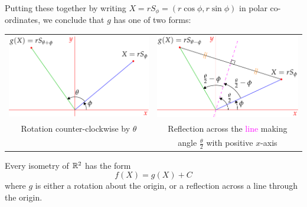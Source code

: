 Putting these together by writing $X=rS_\phi=(r\cos\phi,r\sin\phi)$ in polar co-ordinates, we conclude that $g$ has one of two forms:
\begin{center}
	\begin{tabular}{c@{\qquad}c}
		\includegraphics[scale=0.95]{isom-rot}
		&
		\includegraphics[scale=0.95]{isom-refl}\\
		Rotation counter-clockwise by $\theta$
		&
		Reflection across the \textcolor{Magenta}{line} making
		\\
		&
		angle $\frac\theta 2$ with positive $x$-axis
	\end{tabular}
\end{center}

\begin{thm}{}{}
	Every isometry of $\mathbb{R}^2$ has the form
	\[
		f(X)=g(X)+C
	\]
	where $g$ is either a rotation about the origin, or a reflection across a line through the origin. 
\end{thm}

\goodbreak



